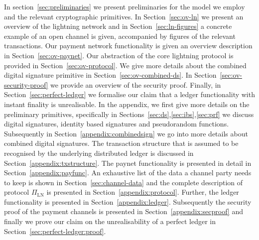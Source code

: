  In section~\ref{sec:preliminaries} we present
preliminaries for the model we employ and the relevant cryptographic primitives.
In Section~\ref{sec:ov-ln} we present an overview of the lightning network and
in Section~\ref{sec:ln-figures} a concrete example of an open channel is given,
accompanied by figures of the relevant transactions. Our payment network
functionality is given an overview description in Section~\ref{sec:ov-paynet}.
Our abstraction of the core lightning protocol is provided in
Section~\ref{sec:ov-protocol}. We give more details about the combined digital
signature primitive in Section~\ref{sec:ov-combined-ds}. In
Section~\ref{sec:ov-security-proof} we provide an overview of the security
proof. Finally, in Section~\ref{sec:perfect-ledger} we formalise our claim that
a ledger functionality with instant finality is unrealisable. In the appendix,
we first give more details on the preliminary primitives, specifically in
Sections~\ref{sec:ds},\ref{sec:ibs},\ref{sec:prf} we discuss digital signatures,
identity based signatures and pseudorandom functions. Subsequently in
Section~\ref{appendix:combinedsign} we go into more details about combined
digital signatures. The transaction structure that is assumed to be recognised
by the underlying distributed ledger is discussed in
Section~\ref{appendix:txstructure}. The paynet functionality is presented in
detail in Section~\ref{appendix:payfunc}. An exhaustive list of the data a
channel party needs to keep is shown in Section~\ref{sec:channel-data} and the
complete description of protocol $\Pi_{\mathrm{LN}}$ is presented in
Section~\ref{appendix:protocol}. Further, the ledger functionality is presented
in Section~\ref{appendix:ledger}. Subsequently the security proof of the payment
channels is presented in Section~\ref{appendix:secproof} and finally we prove
our claim on the unrealisability of a perfect ledger in
Section~\ref{sec:perfect-ledger:proof}.
